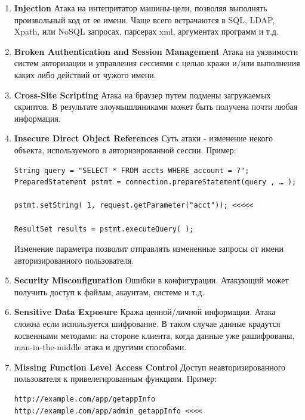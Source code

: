 \documentclass[10pt,a4paper]{article}
\begin{document}
\begin{enumerate}
\item \textbf{Injection} Атака на интепритатор машины-цели, позволяя выполнять произвольный код от ее имени. Чаще всего встрачаются в SQL, LDAP, Xpath, или NoSQL запросах, парсерах xml, аргументах программ и т.д.

\item \textbf{Broken Authentication and Session Management} Атака на уязвимости систем авторизации и управления сессиями с целью кражи и/или выполнения каких либо действий от чужого имени.

\item \textbf{Cross-Site Scripting} Атака на браузер путем подмены загружаемых скриптов. В результате злоумышлиниками может быть получена почти любая информация.

\item \textbf{Insecure Direct Object References} Суть атаки - изменение некого объекта, используемого в авторизированной сессии. Пример: 
\begin{verbatim}
String query = "SELECT * FROM accts WHERE account = ?";
PreparedStatement pstmt = connection.prepareStatement(query , … );

pstmt.setString( 1, request.getParameter("acct")); <<<<<

ResultSet results = pstmt.executeQuery( );
\end{verbatim}

Изменение параметра позволит отправлять измененные запросы от имени авторизированного пользователя.

\item \textbf{Security Misconfiguration} Ошибки в конфигурации. Атакующий может получить доступ к файлам, акаунтам, системе и т.д.

\item \textbf{Sensitive Data Exposure} Кража ценной/личной информации. Атака сложна если используется шифрование. В таком случае данные крадутся косвенными методами: на стороне клиента, когда данные уже рашифрованы, man-in-the-middle атака и другими способами.

\item \textbf{Missing Function Level Access Control} Доступ неавторизированного пользователя к привелегированным функциям. 
Пример: 

\begin{verbatim}
http://example.com/app/getappInfo
http://example.com/app/admin_getappInfo <<<<
\end{verbatim}


\end{enumerate}
\end{document}
